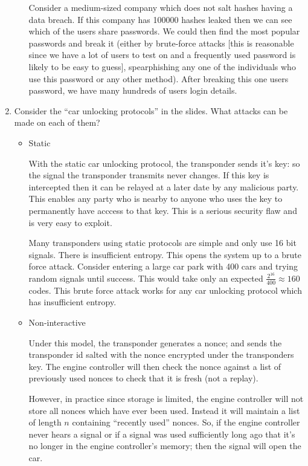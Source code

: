 \documentclass[10pt,\jkfside,a4paper]{article}
\begin{document}
\begin{enumerate}
\begin{enumerate}
Consider a medium-sized company which does not salt hashes having a data breach. If this company 
has 100000 hashes leaked then we can see which of the users share passwords. We could then 
find the most popular passwords and break it (either by brute-force attacks [this is reasonable since 
we have a lot of users to test on and a frequently used password is likely to be easy to guess], 
spearphishing any one of the individuals who use this password or 
any other method). After breaking this one users password, we have many hundreds of users login 
details.

\end{enumerate}

\item Consider the ``car unlocking protocols'' in the slides. What attacks can be made on each of them?

\begin{itemize}

\item Static

With the static car unlocking protocol, the transponder sends it's key: so the signal the transponder 
transmits never changes. If this key is intercepted then it can be relayed at a 
later date by any malicious party. This enables any party who is nearby to anyone who uses the key to 
permanently have acccess to that key. This is a serious security flaw and is very easy to exploit.

Many transponders using static protocols are simple and only use 16 bit signals. 
There is insufficient entropy. This opens the system up to a brute force attack. Consider 
entering a large car park with 400 cars and trying random signals until success. This 
would take only an expected $\frac{2^{16}}{400} \approx 160$ codes. This brute force attack 
works for any car unlocking protocol which has insufficient entropy.

\item Non-interactive

Under this model, the transponder generates a nonce; and sends
the transponder id salted with the nonce encrypted under the transponders key.
The engine controller will then check the nonce against a list of previously used 
nonces to check that it is fresh (not a replay). 

However, in practice since storage is limited, the engine controller will not store 
all nonces which have ever been used. Instead it will maintain a list of length $n$ 
containing ``recently used'' nonces. So, if the engine controller never hears a signal 
or if a signal was used sufficiently long ago that it's no longer in the engine controller's 
memory; then the signal will open the car.


\end{itemize}
\end{enumerate}
\end{document}
